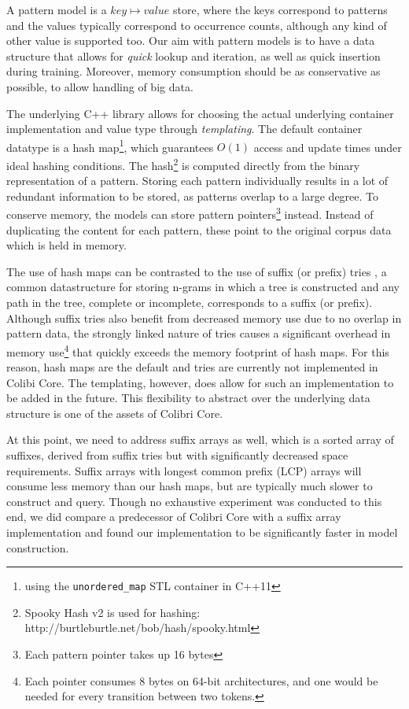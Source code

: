 A pattern model is a $key \mapsto value$ store, where the keys correspond to
patterns and the values typically correspond to occurrence counts, although any
kind of other value is supported too. Our aim with pattern models is to have a
data structure that allows for \emph{quick} lookup and iteration, as well as
quick insertion during training. Moreover, memory consumption should be as
conservative as possible, to allow handling of big data.

The underlying C++ library allows for choosing the actual underlying container
implementation and value type through \emph{templating}. The default container
datatype is a hash map\footnote{using the \texttt{unordered\_map} STL container
in C++11}, which guarantees $O(1)$ access and update times under ideal hashing
conditions. The hash\footnote{Spooky Hash v2 is used for hashing:
http://burtleburtle.net/bob/hash/spooky.html} is computed directly from the
binary representation of a pattern. Storing each pattern individually results
in a lot of redundant information to be stored, as patterns overlap to a large
degree. To conserve memory, the models can store pattern pointers\footnote{Each
pattern pointer takes up 16 bytes} instead. Instead of duplicating the content
for each pattern, these point to the original corpus data which is held in
memory.

The use of hash maps can be contrasted to the use of suffix (or prefix) tries
\citep{Weiner73}, a common datastructure for storing n-grams in which a tree is
constructed and any path in the tree, complete or incomplete, corresponds to a
suffix (or prefix).  Although suffix tries also benefit from decreased memory
use due to no overlap in pattern data, the strongly linked nature of tries
causes a significant overhead in memory use\footnote{Each pointer consumes 8
    bytes on 64-bit architectures, and one would be needed for every transition
between two tokens.} that quickly exceeds the memory footprint of hash maps.
For this reason, hash maps are the default and tries are currently not
implemented in Colibi Core. The templating, however, does allow for such an
implementation to be added in the future. This flexibility to abstract over the
underlying data structure is one of the assets of Colibri Core.

At this point, we need to address suffix arrays \citep{Manber90} as well, which
is a sorted array of suffixes, derived from suffix tries but with significantly
decreased space requirements. Suffix arrays with longest common prefix (LCP)
arrays will consume less memory than our hash maps, but are typically much
slower to construct and query. Though no exhaustive experiment was conducted to
this end, we did compare a predecessor of Colibri Core with a suffix array
implementation \citep{Stehouwer10} and found our implementation to be
significantly faster in model construction.

